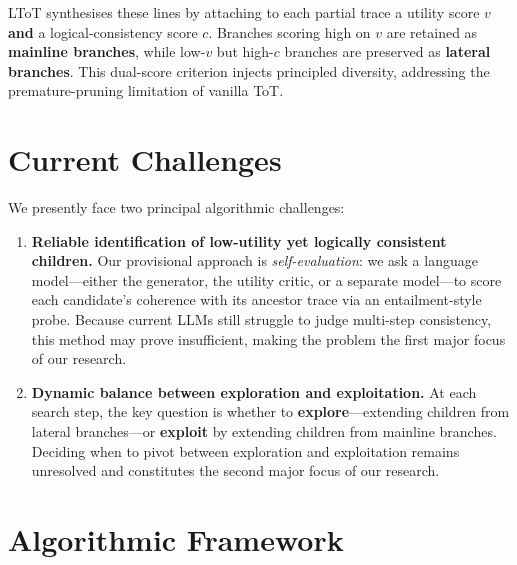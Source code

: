 \documentclass[onecolumn]{IEEEtran}
\begin{document}
LToT synthesises these lines by attaching to each partial trace a utility score $v$ \textbf{and} a logical-consistency score $c$.
Branches scoring high on $v$ are retained as \textbf{mainline branches}, while low-$v$ but high-$c$ branches are preserved as \textbf{lateral branches}.
This dual-score criterion injects principled diversity, addressing the premature-pruning limitation of vanilla ToT.


\section{Current Challenges}
\label{section:current-challenges}

We presently face two principal algorithmic challenges:

\begin{enumerate}
    \item
        \textbf{Reliable identification of low-utility yet logically consistent children.}
        Our provisional approach is \textit{self-evaluation}: we ask a language model—either the generator, the utility critic, or a separate model—to score each candidate's coherence with its ancestor trace via an entailment-style probe.
        Because current LLMs still struggle to judge multi-step consistency, this method may prove insufficient, making the problem the first major focus of our research.
    \item
        \textbf{Dynamic balance between exploration and exploitation.}
        At each search step, the key question is whether to \textbf{explore}---extending children from lateral branches---or \textbf{exploit} by extending children from mainline branches.
        Deciding when to pivot between exploration and exploitation remains unresolved and constitutes the second major focus of our research.
\end{enumerate}


\section{Algorithmic Framework}
\label{section:algorithmic-framework}
\end{document}
